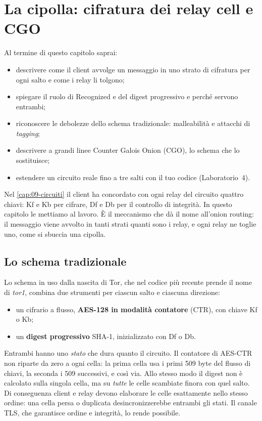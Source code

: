 \chapter{La cipolla: cifratura dei relay cell e CGO}\label{cap:10-cifratura-relay}

\begin{obiettivi}
Al termine di questo capitolo saprai:
\begin{itemize}[nosep]
  \item descrivere come il client avvolge un messaggio in uno strato di cifratura per ogni salto e come i relay li tolgono;
  \item spiegare il ruolo di Recognized e del digest progressivo e perché servono entrambi;
  \item riconoscere le debolezze dello schema tradizionale: malleabilità e attacchi di \emph{tagging};
  \item descrivere a grandi linee Counter Galois Onion (CGO), lo schema che lo sostituisce;
  \item estendere un circuito reale fino a tre salti con il tuo codice (Laboratorio~4).
\end{itemize}
\end{obiettivi}

Nel \cref{cap:09-circuiti} il client ha concordato con ogni relay del circuito quattro chiavi: Kf e Kb per cifrare, Df e Db per il controllo di integrità. In questo capitolo le mettiamo al lavoro. È il meccanismo che dà il nome all'onion routing: il messaggio viene avvolto in tanti strati quanti sono i relay, e ogni relay ne toglie uno, come si sbuccia una cipolla.

\section{Lo schema tradizionale}\label{sec:tor1}

Lo schema in uso dalla nascita di Tor, che nel codice più recente prende il nome di \emph{tor1}, combina due strumenti per ciascun salto e ciascuna direzione:
\begin{itemize}
  \item un cifrario a flusso, \textbf{AES-128 in modalità contatore} (CTR), con chiave Kf o Kb;
  \item un \textbf{digest progressivo} SHA-1, inizializzato con Df o Db.
\end{itemize}
Entrambi hanno uno \emph{stato} che dura quanto il circuito. Il contatore di AES-CTR non riparte da zero a ogni cella: la prima cella usa i primi 509 byte del flusso di chiavi, la seconda i 509 successivi, e così via. Allo stesso modo il digest non è calcolato sulla singola cella, ma su \emph{tutte} le celle scambiate finora con quel salto. Di conseguenza client e relay devono elaborare le celle esattamente nello stesso ordine: una cella persa o duplicata desincronizzerebbe entrambi gli stati. Il canale TLS, che garantisce ordine e integrità, lo rende possibile.

